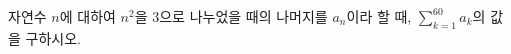 \hspace*{2mm}\begin{minipage}[t]{\dimexpr\linewidth-2mm\relax}\vspace{0pt}
자연수 $n$에 대하여 $n^2$을 $3$으로 나누었을 때의 나머지를 $a_n$이라 할 때, $\displaystyle\sum_{k=1}^{60}a_k$의 값을 구하시오.\end{minipage}
